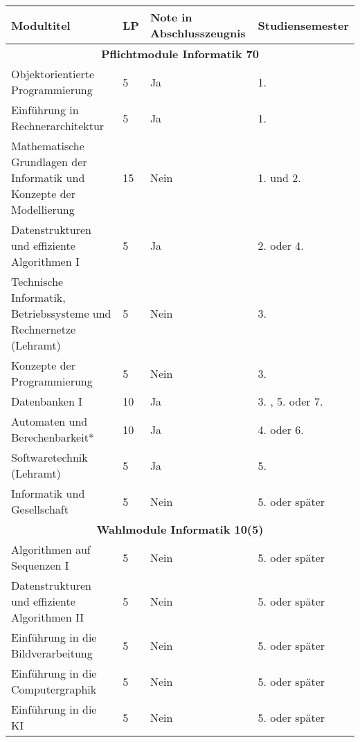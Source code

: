 \begin{table}[tbp]
	\begin{small}
		\begin{tabularx}{\textwidth}{|b{}|X|X|X|}
			\hline
			Modultitel                                                            & LP & Note in Abschlusszeugnis & Studien\-semester \\
			\hline
			\multicolumn{4}{|c|}{\textbf{Pflichtmodule Informatik 70}}\\\hline
			Objektorientierte Programmierung                                      &  5 & Ja   & 1. \\
			Einführung in Rechnerarchitektur                                      &  5 & Ja   & 1. \\
			Mathematische Grundlagen der Informatik und Konzepte der Modellierung & 15 & Nein & 1. und 2. \\
			Datenstrukturen und effiziente Algorithmen I                          &  5 & Ja   & 2. oder 4. \\
			Technische Informatik, Betriebssysteme und Rechnernetze (Lehramt)     &  5 & Nein & 3. \\
			Konzepte der Programmierung                                           &  5 & Nein & 3. \\
			Datenbanken I                                                         & 10 & Ja   & 3. , 5. oder 7. \\
			Automaten und Berechenbarkeit*                                        & 10 & Ja   & 4. oder 6. \\
			Softwaretechnik (Lehramt)                                             &  5 & Ja   & 5. \\
			Informatik und Gesellschaft                                           &  5 & Nein & 5. oder später \\
			\hline
			\multicolumn{4}{|c|}{\textbf{Wahlmodule Informatik 10(5)}}\\\hline
			Algorithmen auf Sequenzen I                      & 5 & Nein & 5. oder später \\
			Datenstrukturen und effiziente Algorithmen II    & 5 & Nein & 5. oder später \\
			Einführung in die Bildverarbeitung               & 5 & Nein & 5. oder später \\
			Einführung in die Computergraphik                & 5 & Nein & 5. oder später \\
			Einführung in die KI                             & 5 & Nein & 5. oder später \\

\end{tabularx}
\end{small}
\end{table}
